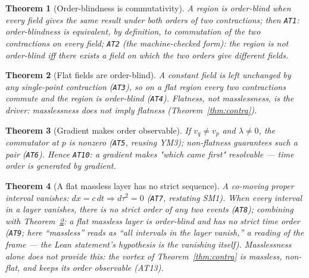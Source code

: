 \documentclass[aps,prd,preprint,superscriptaddress,amsmath,amssymb]{revtex4-2}
\newtheorem{theorem}{Theorem}[section]
\begin{document}
\begin{theorem}[Order-blindness is commutativity]
\label{thm:orderblind}
A region is \emph{order-blind} when every field gives the same result
under both orders of two contractions; then \texttt{AT1}:
order-blindness is equivalent, by definition, to commutation of the
two contractions on every field; \texttt{AT2} (the machine-checked
form): the region is not order-blind iff there exists a field on which
the two orders give different fields.
\end{theorem}

\begin{theorem}[Flat fields are order-blind]
\label{thm:flat}
A constant field is left unchanged by any single-point contraction
(\texttt{AT3}), so on a flat region every two contractions commute and
the region is order-blind (\texttt{AT4}).  Flatness, not
masslessness, is the driver: masslessness does not imply flatness
(Theorem~\ref{thm:contra}).
\end{theorem}

\begin{theorem}[Gradient makes order observable]
\label{thm:gradient}
If $v_q\ne v_p$ and $\lambda\ne0$, the commutator at $p$ is nonzero
(\texttt{AT5}, reusing YM3); non-flatness guarantees such a pair
(\texttt{AT6}).  Hence \texttt{AT10}: \emph{a gradient makes "which
came first" resolvable --- time order is generated by gradient.}
\end{theorem}

\begin{theorem}[A flat massless layer has no strict sequence]
\label{thm:massless}
A co-moving proper interval vanishes: $dx=c\,dt \Rightarrow
d\tau^2=0$ (\texttt{AT7}, restating SM1).  When every interval in a
layer vanishes, there is no strict order of any two events
(\texttt{AT8}); combining with Theorem~\ref{thm:flat}: a flat
massless layer is order-blind and has no strict time order
(\texttt{AT9}; here ``massless'' reads as ``all intervals in the
layer vanish,'' a reading of the frame --- the Lean statement's
hypothesis is the vanishing itself).  Masslessness alone does not
provide this: the
vortex of Theorem~\ref{thm:contra} is massless, non-flat, and keeps
its order observable (AT13).
\end{theorem}
\end{document}
